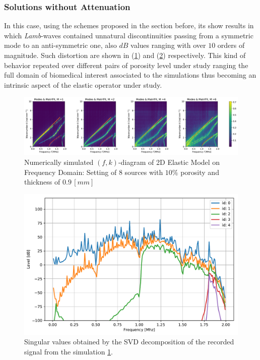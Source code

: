 \subsubsection{Solutions without Attenuation}
In this case, using the schemes proposed in the section before, its show results in which \textit{Lamb}-waves contained unnatural discontinuities passing from a symmetric mode to an anti-symmetric one, also $dB$ values ranging with over $10$ orders of magnitude. Such distortion are shown in (\ref{FK-Freq-DiagramS8P10M09}) and (\ref{SVD-Freq-S8P10M09}) respectively. This kind of behavior repeated over different pairs of porosity level under study ranging the full domain of biomedical interest associated to the simulations thus becoming an intrinsic aspect of the elastic operator under study.

\begin{figure}[!h]
	\centering
	\includegraphics[width=\textwidth]{images/FreqRes/2DFreqS8P10ElasticFK09M300_y.pdf}
	\caption{Numerically simulated $(f,k)$-diagram of 2D Elastic Model on Frequency Domain: Setting of 8 sources with $10\%$ porosity and thickness of $0.9 \,[mm]$}
	\label{FK-Freq-DiagramS8P10M09}
\end{figure} 

\begin{figure}[!h]
	\centering
	\includegraphics[scale=.5]{images/FreqRes/2DFreqS810Elastic09_SV.pdf}
	\caption{Singular values obtained by the SVD decomposition of the recorded signal from the simulation \ref{FK-Freq-DiagramS8P10M09}.}
	\label{SVD-Freq-S8P10M09}
\end{figure}

